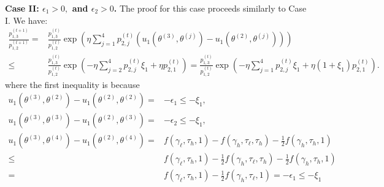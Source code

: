 \noindent \textbf{Case II: $\epsilon_1>0,$ and $\epsilon_2>0$.} 
The proof for this case proceeds similarly to Case I.
We have:
\begin{equation}
    \begin{split}
    \label{eqn:case2:1113112}
\frac{p^{(t+1)}_{1,3}}{p^{(t+1)}_{1,2}} = {} & \frac{p^{(t)}_{1,3}}{p^{(t)}_{1,2}}\exp\left( \eta \sum_{j=1}^4p^{(t)}_{2,j}\left(u_1\left(\theta^{(3)}, \theta^{(j)}\right)-u_1\left(\theta^{(2)}, \theta^{(j)}\right)\right) \right) \\
\leq {} & \frac{p^{(t)}_{1,3}}{p^{(t)}_{1,2}}\exp\left( -\eta \sum_{j=2}^4p^{(t)}_{2,j}\xi_1   + \eta p^{(t)}_{2,1} \right)
=  \frac{p^{(t)}_{1,3}}{p^{(t)}_{1,2}}\exp\left( -\eta \sum_{j=1}^4p^{(t)}_{2,j}\xi_1   + \eta(1+\xi_1)  p^{(t)}_{2,1}\right).
    \end{split}
\end{equation}
where the first inequality is because 
\begin{equation*}
   \begin{split}
    u_1(\theta^{(3)},\theta^{(2)}) - u_1(\theta^{(2)},\theta^{(2)}) = {} &-\epsilon_1\leq -\xi_1, \\
      u_1(\theta^{(3)},\theta^{(3)}) - u_1(\theta^{(2)},\theta^{(3)}) ={} & -\epsilon_2\leq -\xi_1, \\
      u_1(\theta^{(3)},\theta^{(4)}) - u_1(\theta^{(2)},\theta^{(4)}) ={} & f(\gamma_{\ell},\tau_{h},1) - f(\gamma_{h},\tau_{\ell},\tau_{h})-\frac{1}{2} f(\gamma_{h},\tau_{h},1)\\
      \leq {} & f(\gamma_{\ell},\tau_{h},1) - \frac{1}{2}f(\gamma_{h},\tau_{\ell},\tau_{h})-\frac{1}{2} f(\gamma_{h},\tau_{h},1)\\
      = {} & f(\gamma_{\ell},\tau_{h},1) - \frac{1}{2}f(\gamma_{h},\tau_{\ell},1)=-\epsilon_1\leq -\xi_1
   \end{split} 
\end{equation*}


